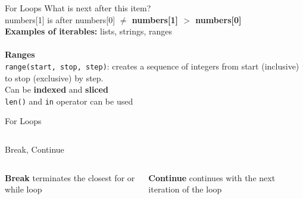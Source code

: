         \begin{frame}{For Loops}
            \LARGE
            What is next after this item?\\
            numbers[1] is after numbers[0] \textbf{$\neq$ numbers[1] $>$ numbers[0]}\\
            \textbf{Examples of iterables:} lists, strings, ranges\\
            \huge
            \\
            \textbf{Ranges}\\
            \LARGE
            \texttt{range(start, stop, step)}: creates a sequence of integers from start (inclusive) to stop (exclusive) by step.\\
            Can be \textbf{indexed} and \textbf{sliced}\\
            \texttt{len()} and \texttt{in} operator can be used
        \end{frame}

        \begin{frame}{For Loops}
            \inputminted[frame=single,framesep=2pt]{python3}{../Review1/code-examples/for_loops.py}
        \end{frame}

        \begin{frame}{Break, Continue}
            \begin{columns}
                \begin{column}{0.5\textwidth}
                    \textbf{Break}
                    terminates the closest for or while loop
                    \bigskip  
                    \inputminted[frame=single,framesep=2pt]{python3}{../Lecture3/code-examples/break1.py}
                    \inputminted[frame=single,framesep=2pt]{python3}{../Lecture3/code-examples/break2.py}
                \end{column}
                \begin{column}{0.5\textwidth}
                    \textbf{Continue}
                    continues with the next iteration of the loop
                    \bigskip  
                    \inputminted[frame=single,framesep=2pt]{python3}{../Lecture3/code-examples/continue1.py}
                    \inputminted[frame=single,framesep=2pt]{python3}{../Lecture3/code-examples/continue2.py}
                \end{column} 
            \end{columns}
        \end{frame}
        
